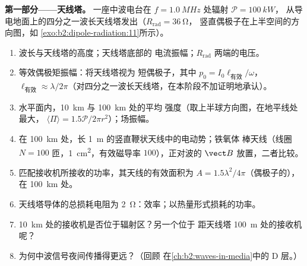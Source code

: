 \begin{problem}
\label{pb:b2:dipole-radiation:1}

\medskip
\noindent\textbf{第一部分——天线塔。}
一座中波电台在 $f = \qty{1.0}{MHz}$ 处辐射 $\mathcal P = \qty{100}{kW}$，
从导电地面上的四分之一波长天线塔发出（$R_{\text{rad}} = \qty{36}{\ohm}$，
竖直偶极子在上半空间的方向图，如
\cref{exo:b2:dipole-radiation:11}所示）。
\begin{enumerate}
  \item 波长与天线塔的高度；天线塔底部的
        电流振幅；$R_{\text{rad}}$ 两端的电压。
  \item 等效偶极矩振幅：将天线塔视为
        短偶极子，其中 $p_0 = I_0\ell_{\text{有效}}/\omega$，$\ell_{\text{有效}} \approx
        \lambda/2\pi$（对四分之一波长天线塔，在本阶段不加证明地承认）。
  \item 水平面内，\qty{10}{km} 与 \qty{100}{km} 处的平均
        强度（取上半球方向图，在地平线处最大，
        $\langle\Pi\rangle = 1.5\mathcal P/2\pi r^2$）；场振幅。
  \item 在 \qty{100}{km} 处，长 \qty{1}{m} 的竖直鞭状天线中的电动势；铁氧体
        棒天线（线圈 $N = 100$ 匝，\qty{1}{cm^2}，有效磁导率
        $100$），正对波的 $\vect B$ 放置，二者比较。
  \item 匹配接收机所接收的功率，其天线的有效面积为
        $A = 1.5\lambda^2/4\pi$（偶极子的），在 \qty{100}{km} 处。
  \item 天线塔导体的总损耗电阻为
        \qty{2}{\ohm}：效率；以热量形式损耗的功率。
  \item \qty{10}{km} 处的接收机是否位于辐射区？另一个位于
        距天线塔 \qty{100}{m} 处的接收机呢？
  \item 为何中波信号夜间传播得更远？（回顾
        在\cref{ch:b2:waves-in-media}中的 D 层。）
\end{enumerate}


\end{problem}
